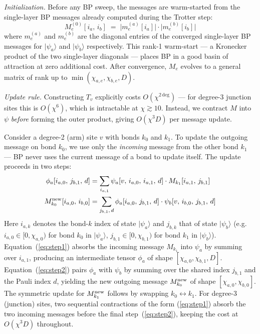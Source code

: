 \documentclass[12pt]{article}
\begin{document}
\emph{Initialization.}
Before any BP sweep, the messages are warm-started from the single-layer
BP messages already computed during the Trotter step:
\begin{equation}
    M_e^{(0)}[i_a,\, i_b]
    \;=\;
    \bigl|m_e^{(a)}[i_a]\bigr| \cdot \bigl|m_e^{(b)}[i_b]\bigr|
    \label{eq:msg_init}
\end{equation}
where $m_e^{(a)}$ and $m_e^{(b)}$ are the diagonal entries of the converged
single-layer BP messages for $|\psi_a\rangle$ and $|\psi_b\rangle$ respectively.
This rank-1 warm-start — a Kronecker product of the two single-layer diagonals
— places BP in a good basin of attraction at zero additional cost.
After convergence, $M_e$ evolves to a general matrix of rank up to
$\min(\chi_{a,e}, \chi_{b,e}, D)$.

\emph{Update rule.}
Constructing $T_v$ explicitly costs $O(\chi^{2\,\text{deg}})$ — for degree-3
junction sites this is $O(\chi^6)$, which is intractable at $\chi\gtrsim 10$.
Instead, we contract $M$ into $\psi$ \emph{before} forming the outer product,
giving $O(\chi^3 D)$ per message update.

Consider a degree-2 (arm) site $v$ with bonds $k_0$ and $k_1$.
To update the outgoing message on bond $k_0$, we use only the
\emph{incoming} message from the other bond $k_1$ — BP never uses the
current message of a bond to update itself.
The update proceeds in two steps:
\begin{align}
    \phi_a[i_{a,0},\, j_{b,1},\, d]
    &= \sum_{i_{a,1}} \psi_a[v,\, i_{a,0},\, i_{a,1},\, d]
       \cdot M_{k_1}[i_{a,1},\, j_{b,1}]
    \label{eq:step1}\\
    M_{k_0}^{\rm new}[i_{a,0},\, i_{b,0}]
    &= \sum_{j_{b,1},\, d} \phi_a[i_{a,0},\, j_{b,1},\, d]
       \cdot \psi_b[v,\, i_{b,0},\, j_{b,1},\, d]
    \label{eq:step2}
\end{align}
Here $i_{a,k}$ denotes the bond-$k$ index of state $|\psi_a\rangle$
and $j_{b,k}$ that of state $|\psi_b\rangle$
(e.g.\ $i_{a,0}\in[0,\chi_{a,0})$ for bond $k_0$ in $|\psi_a\rangle$,
$j_{b,1}\in[0,\chi_{b,1})$ for bond $k_1$ in $|\psi_b\rangle$).
Equation~(\ref{eq:step1}) absorbs the incoming message $M_{k_1}$ into
$\psi_a$ by summing over $i_{a,1}$, producing an
intermediate tensor $\phi_a$ of shape $[\chi_{a,0}, \chi_{b,1}, D]$.
Equation~(\ref{eq:step2}) pairs $\phi_a$ with $\psi_b$ by summing over
the shared index $j_{b,1}$ and the Pauli index $d$, yielding the new
outgoing message $M_{k_0}^{\rm new}$ of shape $[\chi_{a,0}, \chi_{b,0}]$.
The symmetric update for $M_{k_1}^{\rm new}$ follows by swapping $k_0\leftrightarrow k_1$.
For degree-3 (junction) sites, two sequential contractions of the form
(\ref{eq:step1}) absorb the two incoming messages before the final
step~(\ref{eq:step2}), keeping the cost at $O(\chi^3 D)$ throughout.
\end{document}
